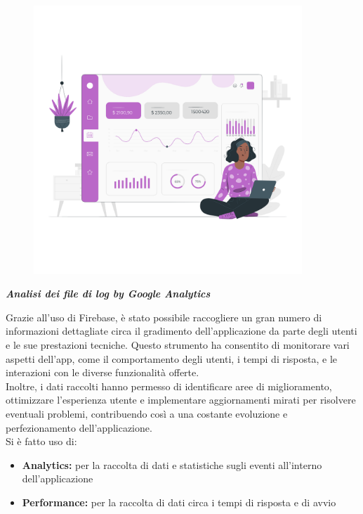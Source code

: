 \documentclass{article}
\begin{document}
		\begin{figure}[H]
			\centering
			\includegraphics[width=0.9\textwidth]{Immagini/fotoanalitiche}
		\end{figure}
		\begin{center}
			\textbf{\textit{\textcolor{dark_purple}{Analisi dei file di log by Google Analytics}}}\\
		\end{center}
		Grazie all'uso di Firebase, è stato possibile raccogliere un gran numero di informazioni dettagliate circa il gradimento dell'applicazione da parte degli utenti e le sue prestazioni tecniche. Questo strumento ha consentito di monitorare vari aspetti dell'app, come il comportamento degli utenti, i tempi di risposta, e le interazioni con le diverse funzionalità offerte.\\
		Inoltre, i dati raccolti hanno permesso di identificare aree di miglioramento, ottimizzare l'esperienza utente e implementare aggiornamenti mirati per risolvere eventuali problemi, contribuendo così a una costante evoluzione e perfezionamento dell'applicazione.\\
		Si è fatto uso di:
		\begin{itemize}
			\item \textbf{Analytics:} per la raccolta di dati e statistiche sugli eventi all'interno dell'applicazione
			\item \textbf{Performance:} per la raccolta di dati circa i tempi di risposta e di avvio
		\end{itemize}
\end{document}
